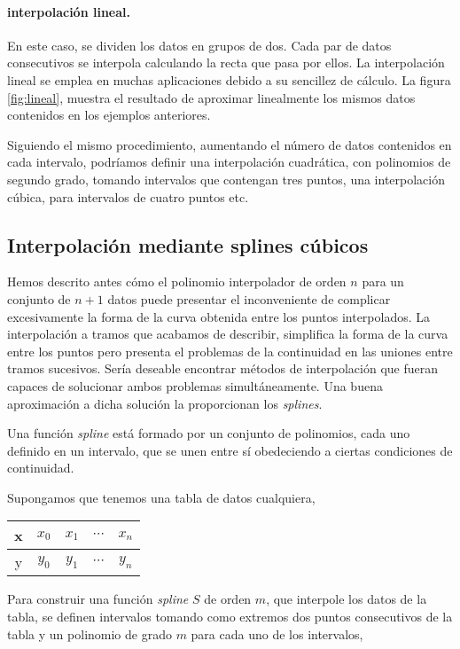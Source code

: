 \paragraph{interpolación lineal.}  En este caso, se dividen los datos en grupos de dos. Cada par de datos consecutivos se interpola calculando la recta que pasa por ellos. La interpolación lineal se emplea en muchas aplicaciones debido a su sencillez de cálculo. La figura \ref{fig:lineal}, muestra el resultado de aproximar linealmente los mismos datos contenidos en los ejemplos anteriores.

Siguiendo el mismo procedimiento, aumentando el número de datos contenidos en cada intervalo, podríamos definir una interpolación cuadrática, con polinomios de segundo grado, tomando intervalos que contengan tres puntos, una interpolación cúbica, para intervalos de cuatro puntos etc.

\subsection{Interpolación mediante splines cúbicos} 
Hemos descrito antes cómo el polinomio interpolador de orden $n$ para un conjunto de $n+1$ datos puede presentar el inconveniente de complicar excesivamente la forma de  la curva obtenida entre los puntos interpolados. La interpolación a tramos que acabamos de describir, simplifica la forma de la curva entre los puntos pero presenta el problemas de la continuidad en las uniones entre tramos sucesivos. Sería deseable encontrar métodos de interpolación que fueran capaces de solucionar ambos problemas simultáneamente. Una buena aproximación a dicha solución la proporcionan los \emph{splines}.

Una función \emph{spline} está formado por un conjunto de polinomios, cada uno definido en un intervalo, que se unen entre sí obedeciendo a ciertas condiciones de continuidad.

Supongamos que tenemos una tabla de datos cualquiera,

\begin{table}[h]
\centering
\begin{tabular}{c|cccc}
x&$x_0$&$x_1$&$\cdots$&$x_n$\\
\hline
y&$y_0$&$y_1$&$\cdots$&$y_n$
\end{tabular}
\end{table}

Para construir una función \emph{spline} $S$ de orden $m$, que interpole los datos de la tabla, se definen intervalos tomando como extremos dos puntos consecutivos de la tabla y un polinomio de grado $m$ para cada uno de los intervalos,

